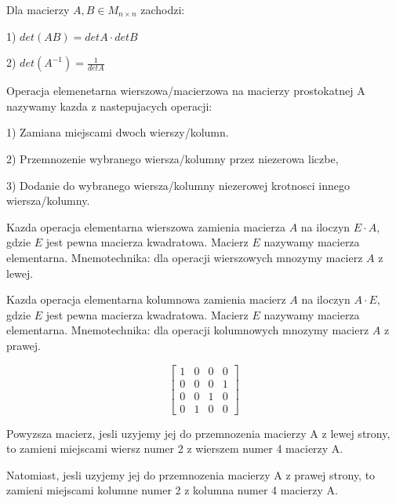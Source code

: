 \documentclass{article}
\begin{document}
\begin{tcolorbox}[colback=white!90!green,colframe=black!35!green,title=Wniosek 2.30 Wlasnosci wyznacznika]

Dla macierzy $A, B \in M_{n \times n}$ zachodzi:

1) $det(AB) = detA \cdot detB$

2) $det(A^{-1}) = \frac{1}{detA}$ 

\end{tcolorbox}


\begin{tcolorbox}[colback=white!90!green,colframe=black!35!green,title=Operacje elementarne wierszowe/kolumnowe.]

Operacja elemenetarna wierszowa/macierzowa na macierzy prostokatnej A nazywamy kazda z nastepujacych operacji:

1) Zamiana miejscami dwoch wierszy/kolumn.

2) Przemnozenie wybranego wiersza/kolumny przez niezerowa liczbe,

3) Dodanie do wybranego wiersza/kolumny niezerowej krotnosci innego wiersza/kolumny.

Kazda operacja elementarna wierszowa zamienia macierza $A$ na iloczyn $E \cdot A$, gdzie $E$ jest pewna macierza kwadratowa. Macierz $E$ nazywamy macierza elementarna.
Mnemotechnika: dla operacji wierszowych mnozymy macierz $A$ z lewej.

Kazda operacja elementarna kolumnowa zamienia macierz $A$ na iloczyn $A \cdot E$, gdzie $E$ jest pewna macierza kwadratowa. Macierz $E$ nazywamy macierza elementarna.
Mnemotechnika: dla operacji kolumnowych mnozymy macierz $A$ z prawej.

\end{tcolorbox}

\begin{tcolorbox}[colback=white!90!green,colframe=black!35!green,title=Macierze elementarne: zamiana wierszy/kolumn]
$$
\begin{bmatrix}
1 & 0 & 0 & 0 \\
0 & 0 & 0 & 1 \\
0 & 0 & 1 & 0 \\
0 & 1 & 0 & 0
\end{bmatrix}$$


Powyzsza macierz, jesli uzyjemy jej do przemnozenia macierzy A z lewej strony, to zamieni miejscami wiersz numer 2 z wierszem numer 4 macierzy A.

Natomiast, jesli uzyjemy jej do przemnozenia macierzy A z prawej strony, to zamieni miejscami kolumne numer 2 z kolumna numer 4 macierzy A.
\end{tcolorbox}
\end{document}
